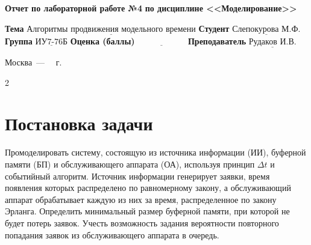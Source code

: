 \documentclass[12pt]{report}
\begin{document}
\begin{titlepage}
		\begin{center}
			\noindent\begin{minipage}{1.1\textwidth}\centering
				\Large\textbf{Отчет по лабораторной работе №4}\newline
				\textbf{по дисциплине <<Моделирование>>}\newline\newline
			\end{minipage}
		\end{center}
		
		\noindent\textbf{Тема} $\underline{\text{Алгоритмы продвижения модельного времени}}$\newline\newline
		\noindent\textbf{Студент} $\underline{\text{Слепокурова М.Ф.}}$\newline\newline
		\noindent\textbf{Группа} $\underline{\text{ИУ7-76Б}}$\newline\newline
		\noindent\textbf{Оценка (баллы)} $\underline{\text{~~~~~~~~~~~~~~~~~}}$\newline\newline
		\noindent\textbf{Преподаватель} $\underline{\text{Рудаков И.В.}}$\newline\newline\newline
		
		\begin{center}
			\vfill
			Москва~---~\the\year
			~г.
		\end{center}
	\end{titlepage}

\setcounter{page} {2}





\section*{Постановка задачи}
Промоделировать систему, состоящую из источника информации (ИИ), буферной памяти (БП) и обслуживающего аппарата (ОА), используя принцип $\Delta t$ и событийный алгоритм. Источник информации генерирует заявки, время появления которых распределено по равномерному закону, а обслуживающий аппарат обрабатывает каждую из них за время, распределенное по закону Эрланга.
Определить минимальный размер буферной памяти, при которой не будет потерь заявок. Учесть возможность задания вероятности повторного попадания заявок из обслуживающего аппарата в очередь.
\end{document}
